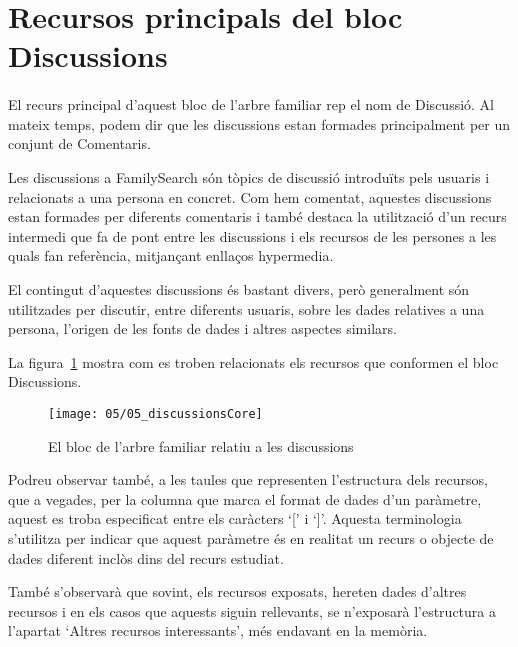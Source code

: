\section{Recursos principals del bloc Discussions}

    \paragraph{}
    El recurs principal d'aquest bloc de l'arbre familiar rep el nom de Discussió. Al mateix temps, podem dir que les discussions estan formades principalment per un conjunt de Comentaris.

    Les discussions a FamilySearch són tòpics de discussió introduïts pels usuaris i relacionats a una persona en concret. Com hem comentat, aquestes discussions estan formades per diferents comentaris i també destaca la utilització d'un recurs intermedi que fa de pont entre les discussions i els recursos de les persones a les quals fan re\-fe\-rèn\-cia, mitjançant enllaços hypermedia.

    El contingut d'aquestes discussions és bastant divers, però generalment són u\-ti\-lit\-za\-des per discutir, entre diferents usuaris, sobre les dades relatives a una persona, l'origen de les fonts de dades i altres aspectes similars.

    La figura~\ref{img:discussionsBloc} mostra com es troben relacionats els recursos que conformen el bloc Discussions.

    \begin{figure}[h]
        \texttt{[image: 05/05\_discussionsCore]}
        \centering
        \caption{El bloc de l'arbre familiar relatiu a les discussions}\label{img:discussionsBloc}
    \end{figure}

    Podreu observar també, a les taules que representen l'estructura dels recursos, que a vegades, per la columna que marca el format de dades d'un paràmetre, aquest es troba especificat entre els caràcters `[' i `]'. Aquesta terminologia s'utilitza per indicar que aquest paràmetre és en realitat un recurs o objecte de dades diferent inclòs dins del recurs estudiat.

    També s'observarà que sovint, els recursos exposats, hereten dades d'altres recursos i en els casos que aquests siguin rellevants, se n'exposarà l'estructura a l'apartat `Altres recursos interessants', més endavant en la memòria.

    
    
    
